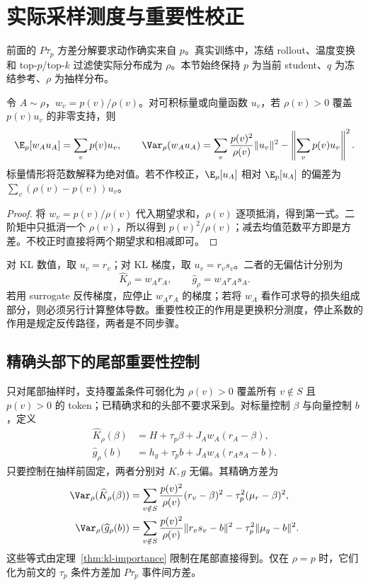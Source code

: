 \section{实际采样测度与重要性校正}
\label{sec:kl-sampling}

前面的 $P\tau_p$ 方差分解要求动作确实来自 $p$。真实训练中，冻结 rollout、温度变换和 top-$p$/top-$k$ 过滤使实际分布成为 $\rho$。本节始终保持 $p$ 为当前 student、$q$ 为冻结参考、$\rho$ 为抽样分布。

\begin{theorem}
\label{thm:kl-importance}
令 $A\sim\rho$，$w_v=p(v)/\rho(v)$。对可积标量或向量函数 $u_v$，若 $\rho(v)>0$ 覆盖 $p(v)u_v$ 的非零支持，则
\[
 \E_\rho[w_Au_A]=\sum_vp(v)u_v,\qquad
 \Var_\rho(w_Au_A)
 =\sum_v\frac{p(v)^2}{\rho(v)}\lVert u_v\rVert^2
  -\left\lVert\sum_vp(v)u_v\right\rVert^2.
\]
标量情形将范数解释为绝对值。若不作校正，$\E_\rho[u_A]$ 相对 $\E_p[u_A]$ 的偏差为 $\sum_v(\rho(v)-p(v))u_v$。
\end{theorem}

\begin{proof}
将 $w_v=p(v)/\rho(v)$ 代入期望求和，$\rho(v)$ 逐项抵消，得到第一式。二阶矩中只抵消一个 $\rho(v)$，所以得到 $p(v)^2/\rho(v)$；减去均值范数平方即是方差。不校正时直接将两个期望求和相减即可。
\end{proof}

对 KL 数值，取 $u_v=r_v$；对 KL 梯度，取 $u_v=r_vs_v$。二者的无偏估计分别为
\[
 \widehat K_\rho=w_Ar_A,\qquad
 \widehat g_\rho=w_Ar_As_A.
\]
若用 surrogate 反传梯度，应停止 $w_A r_A$ 的梯度；若将 $w_A$ 看作可求导的损失组成部分，则必须另行计算整体导数。重要性校正的作用是更换积分测度，停止系数的作用是规定反传路径，两者是不同步骤。

\subsection{精确头部下的尾部重要性控制}

只对尾部抽样时，支持覆盖条件可弱化为 $\rho(v)>0$ 覆盖所有 $v\notin S$ 且 $p(v)>0$ 的 token；已精确求和的头部不要求采到。对标量控制 $\beta$ 与向量控制 $b$，定义
\begin{align}
 \widehat K_\rho(\beta)&=H+\tau_p\beta+J_Aw_A(r_A-\beta), \label{eq:kl-is-scalar}\\
 \widehat g_\rho(b)&=h_g+\tau_pb+J_Aw_A(r_As_A-b). \label{eq:kl-is-vector}
\end{align}
只要控制在抽样前固定，两者分别对 $K,g$ 无偏。其精确方差为
\begin{align}
 \Var_\rho(\widehat K_\rho(\beta))
 &=\sum_{v\notin S}\frac{p(v)^2}{\rho(v)}(r_v-\beta)^2
   -\tau_p^2(\mu_r-\beta)^2, \label{eq:kl-is-scalar-var}\\
 \Var_\rho(\widehat g_\rho(b))
 &=\sum_{v\notin S}\frac{p(v)^2}{\rho(v)}\lVert r_vs_v-b\rVert^2
   -\tau_p^2\lVert\mu_g-b\rVert^2. \label{eq:kl-is-vector-var}
\end{align}
这些等式由定理~\ref{thm:kl-importance} 限制在尾部直接得到。仅在 $\rho=p$ 时，它们化为前文的 $\tau_p$ 条件方差加 $P\tau_p$ 事件间方差。

